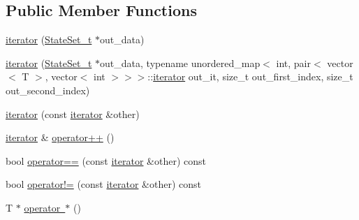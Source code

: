 \subsection*{Public Member Functions}
\begin{DoxyCompactItemize}
\item 
\mbox{\hyperlink{classgraphsat_1_1_state_set_1_1iterator_adada32d7041adaec91fe4cf4e66bca81}{iterator}} (\mbox{\hyperlink{classgraphsat_1_1_state_set_a6474a59203fade7146aacfd0e277ecf4}{State\+Set\+\_\+t}} $\ast$out\+\_\+data)
\item 
\mbox{\hyperlink{classgraphsat_1_1_state_set_1_1iterator_a1b8267daf558c09335c788da43e76c77}{iterator}} (\mbox{\hyperlink{classgraphsat_1_1_state_set_a6474a59203fade7146aacfd0e277ecf4}{State\+Set\+\_\+t}} $\ast$out\+\_\+data, typename unordered\+\_\+map$<$ int, pair$<$ vector$<$ T $>$, vector$<$ int $>$$>$$>$\+::\mbox{\hyperlink{classgraphsat_1_1_state_set_1_1iterator}{iterator}} out\+\_\+it, size\+\_\+t out\+\_\+first\+\_\+index, size\+\_\+t out\+\_\+second\+\_\+index)
\item 
\mbox{\hyperlink{classgraphsat_1_1_state_set_1_1iterator_a03daf90cdc6a7dadbec9e8143401ca33}{iterator}} (const \mbox{\hyperlink{classgraphsat_1_1_state_set_1_1iterator}{iterator}} \&other)
\item 
\mbox{\hyperlink{classgraphsat_1_1_state_set_1_1iterator}{iterator}} \& \mbox{\hyperlink{classgraphsat_1_1_state_set_1_1iterator_ad04c85205e29d8703a9b79d2716dbf0d}{operator++}} ()
\item 
bool \mbox{\hyperlink{classgraphsat_1_1_state_set_1_1iterator_a844e07cabc180b39987d21961753c7d6}{operator==}} (const \mbox{\hyperlink{classgraphsat_1_1_state_set_1_1iterator}{iterator}} \&other) const
\item 
bool \mbox{\hyperlink{classgraphsat_1_1_state_set_1_1iterator_a945fcc22d0f78de46730916aa645be16}{operator!=}} (const \mbox{\hyperlink{classgraphsat_1_1_state_set_1_1iterator}{iterator}} \&other) const
\item 
T $\ast$ \mbox{\hyperlink{classgraphsat_1_1_state_set_1_1iterator_accc984e09b95fac54cbdca29d801a5fb}{operator $\ast$}} ()
\end{DoxyCompactItemize}
